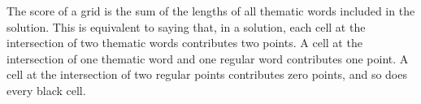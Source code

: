 The score of a grid is the sum of the lengths of all thematic words included in the solution. 
This is equivalent to saying that, in a solution, each cell at the intersection of two
thematic words contributes two points. A cell at the intersection of one thematic word
and one regular word contributes one point. A cell at the intersection of two 
regular points contributes zero points, and so does every black cell.

